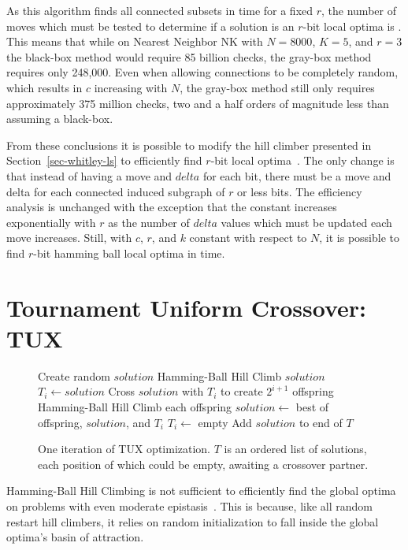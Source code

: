 As this algorithm finds all connected subsets in  time for a fixed $r$, the number of moves
which must be tested to determine if a solution is an $r$-bit local optima is . This means that
while on Nearest Neighbor NK with $N=8000$, $K=5$, and $r=3$ the black-box method would require 85 billion
checks, the gray-box method requires only 248,000. Even when allowing connections to be completely random,
which results in $c$ increasing with $N$, the gray-box method still only requires approximately 375 million checks,
two and a half orders of magnitude less than assuming a black-box.

From these conclusions it is possible to modify the hill climber presented in Section~\ref{sec-whitley-ls} to
efficiently find $r$-bit local optima~\cite{chicano:2014:ball}. The only change is that instead of having a move
and $delta$ for each bit, there must be a move and delta for each connected induced subgraph of $r$ or less bits.
The efficiency analysis is unchanged with the exception that the constant increases exponentially with $r$ as
the number of $delta$ values which must be updated each move increases. Still, with $c$, $r$, and $k$ constant
with respect to $N$, it is possible to find $r$-bit hamming ball local optima in  time.

\section{Tournament Uniform Crossover: TUX}
\label{sec-tux}
\begin{figure}
  \begin{algorithmic}[1]
    \State Create random $solution$
    \State Hamming-Ball Hill Climb $solution$
        \State $T_i \leftarrow solution$
        \State \Return
      \EndIf
      \State Cross $solution$ with $T_i$ to create $2^{i+1}$ offspring
      \State Hamming-Ball Hill Climb each offspring
      \State $solution \leftarrow$ best of offspring, $solution$, and $T_i$
      \State $T_i \leftarrow$ empty
    \EndFor
    \State Add $solution$ to end of $T$
  \EndProcedure
\end{algorithmic}
  \caption{One iteration of TUX optimization. $T$ is an
           ordered list of solutions, each position of which could be empty,
           awaiting a crossover partner.}
  \label{fig-TUX}
\end{figure}

Hamming-Ball Hill Climbing is not sufficient to efficiently find the global optima
on problems with even moderate epistasis~\cite{chicano:2014:ball}. This is because,
like all random restart hill climbers, it relies on random initialization to fall
inside the global optima's basin of attraction.

